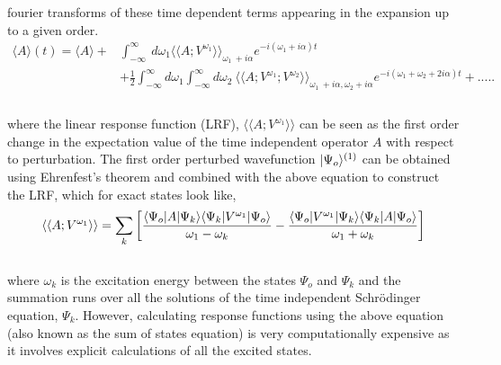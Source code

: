 fourier transforms of these time dependent terms appearing in the expansion up to a given order.
\\
\begin{equation}
\begin{split}
\langle A \rangle (t) = \langle A \rangle + & \int_{-\infty}^{\infty}\
d\omega_1{\langle\langle A;V^{\omega_1}\rangle\rangle}_{\omega_1  \
+ i\alpha}e^{-i(\omega_1 + i\alpha)t} \\
& + \frac{1}{2} \int_{-\infty}^{\infty}d\omega_1\int_{-\infty}^{\infty}d\omega_2\
{\langle\langle A;V^{\omega_1};V^{\omega_2}\rangle\rangle}_{\omega_1 \
+ i\alpha,\omega_2 + i\alpha}e^{-i(\omega_1 + \omega_2 + 2i\alpha)t} + ..... \\
\end{split}
\end{equation}
\\
where the linear response function (LRF), $\langle\langle A;V^{\omega_1}\rangle\rangle$ can be
seen as the first order change in the expectation value of the time independent operator $A$ 
with respect to perturbation. The first order perturbed wavefunction $| \Psi_o \rangle^{(1)}$
can be obtained using Ehrenfest's theorem and combined with the above equation to construct 
the LRF, which for exact states look like,
\\
\begin{equation}
\langle\langle A;V^{\omega_1}\rangle\rangle = \sum_k\bigg[
\frac{\langle \Psi_o |A| \Psi_k \rangle\langle \Psi_k |V^{\omega_1}| \Psi_o \rangle}{\omega_1
- \omega_k}  -
\frac{\langle \Psi_o |V^{\omega_1}| \Psi_k \rangle\langle \Psi_k |A| \Psi_o \rangle}{\omega_1 + \omega_k}\bigg]
\end{equation}
\\
where $\omega_k$ is the excitation energy between the states $\Psi_o$ and $\Psi_k$ 
and the summation runs over all the solutions of the time independent Schr\"odinger equation, $\Psi_k$.
However, calculating response functions using the above equation (also known as the sum of states equation)
is very computationally expensive as it involves explicit calculations of all the excited states.
